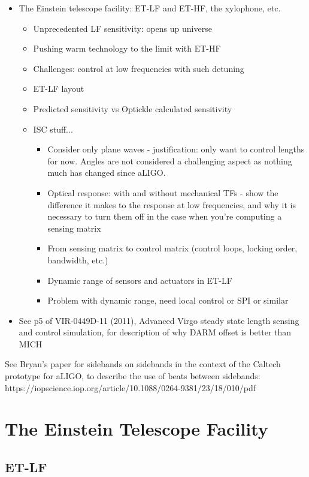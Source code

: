 \begin{itemize}
  \item The Einstein telescope facility: ET-LF and ET-HF, the xylophone, etc.
    \begin{itemize}
      \item Unprecedented LF sensitivity: opens up universe
      \item Pushing warm technology to the limit with ET-HF
      \item Challenges: control at low frequencies with such detuning
      \item ET-LF layout
      \item Predicted sensitivity vs Optickle calculated sensitivity
      \item ISC stuff...
	\begin{itemize}
	  \item Consider only plane waves - justification: only want to control lengths for now. Angles are not considered a challenging aspect as nothing much has changed since aLIGO.
	  \item Optical response: with and without mechanical TFs - show the difference it makes to the response at low frequencies, and why it is necessary to turn them off in the case when you're computing a sensing matrix
	  \item From sensing matrix to control matrix (control loops, locking order, bandwidth, etc.)
	  \item Dynamic range of sensors and actuators in ET-LF
	  \item Problem with dynamic range, need local control or SPI or similar
	\end{itemize}
      \end{itemize}
      
  \item See p5 of VIR-0449D-11 (2011), Advanced Virgo steady state length sensing and control simulation, for description of why DARM offset is better than MICH
\end{itemize}
  
See Bryan's paper for sidebands on sidebands in the context of the Caltech prototype for aLIGO, to describe the use of beats between sidebands: https://iopscience.iop.org/article/10.1088/0264-9381/23/18/010/pdf

\section{The Einstein Telescope Facility}

\subsection{ET-LF}

